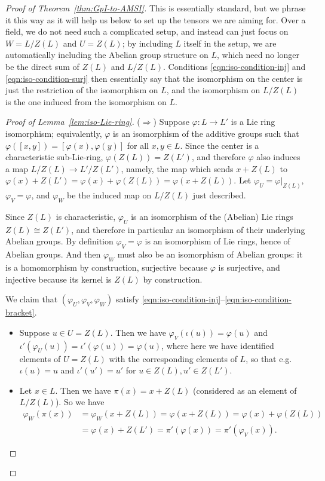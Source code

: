 \begin{proof}[Proof of Theorem~\ref{thm:GpI-to-AMSI}]
This is essentially standard, but we phrase it this way as it will help us below to set up the tensors we are aiming for. Over a field, we do not need such a complicated setup, and instead can just focus on $W=L/Z(L)$ and $U=Z(L)$; by including $L$ itself in the setup, we are automatically including the Abelian group structure on $L$, which need no longer be the direct sum of $Z(L)$ and $L/Z(L)$. Conditions \eqref{eqn:iso-condition-inj} and \eqref{eqn:iso-condition-surj} then essentially say that the isomorphism on the center is just the restriction of the isomorphism on $L$, and the isomorphism on $L/Z(L)$ is the one induced from the isomorphism on $L$.

\begin{proof}[Proof of Lemma~\ref{lem:iso-Lie-ring}]
($\Rightarrow$) Suppose $\varphi \colon L \to L'$ is a Lie ring isomorphism; equivalently, $\varphi$ is an isomorphism of the additive groups such that $\varphi([x,y]) = [\varphi(x), \varphi(y)]$ for all $x,y \in L$. Since the center is a characteristic sub-Lie-ring, $\varphi(Z(L)) = Z(L')$, and therefore $\varphi$ also induces a map $L/Z(L) \to L'/Z(L')$, namely, the map which sends $x + Z(L)$ to $\varphi(x) + Z(L') = \varphi(x) + \varphi(Z(L)) = \varphi(x + Z(L))$. Let $\varphi_U = \varphi|_{Z(L)}$, $\varphi_V = \varphi$, and $\varphi_W$ be the induced map on $L/Z(L)$ just described.

Since $Z(L)$ is characteristic, $\varphi_U$ is an isomorphism of the (Abelian) Lie rings $Z(L) \cong Z(L')$, and therefore in particular an isomorphism of their underlying Abelian groups. By definition $\varphi_V = \varphi$ is an isomorphism of Lie rings, hence of Abelian groups. And then $\varphi_W$ must also be an isomorphism of Abelian groups: it is a homomorphism by construction, surjective because $\varphi$ is surjective, and injective because its kernel is $Z(L)$ by construction. 

We claim that $(\varphi_U, \varphi_V, \varphi_W)$ satisfy \eqref{eqn:iso-condition-inj}--\eqref{eqn:iso-condition-bracket}.
\begin{itemize}
\item[\ref{eqn:iso-condition-inj}: ] Suppose $u \in U = Z(L)$. Then we have $\varphi_V(\iota(u)) = \varphi(u)$ and $\iota'(\varphi_U(u)) = \iota'(\varphi(u)) = \varphi(u)$, where here we have identified elements of $U = Z(L)$ with the corresponding elements of $L$, so that e.g. $\iota(u) = u$ and $\iota'(u') = u'$ for $u \in Z(L), u' \in Z(L')$.

\item[\ref{eqn:iso-condition-surj}: ] Let $x \in L$. Then we have $\pi(x) = x + Z(L)$ (considered as an element of $L/Z(L)$). So we have 
\begin{align*}
\varphi_W(\pi(x)) & = \varphi_W(x + Z(L)) = \varphi(x + Z(L)) = \varphi(x) + \varphi(Z(L)) \\ & = \varphi(x) + Z(L') = \pi'(\varphi(x)) = \pi'(\varphi_V(x)).
\end{align*}


\end{itemize}
\end{proof}
\end{proof}
